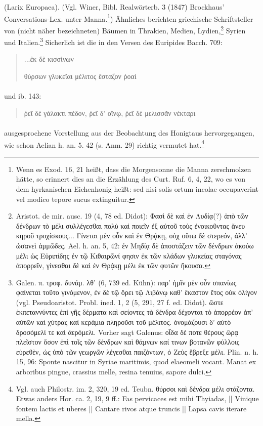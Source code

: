 \documentclass[a4paper, 11pt, oneside]{article}
\begin{document}
(Larix Europaea). (Vgl. Winer, Bibl. Realwörterb. 3 (1847) Brockhaus' Conversations-Lex. unter Manna.\footnote{Wenn es Exod. 16, 21 heißt, dass die Morgensonne die Manna zerschmolzen hätte, so erinnert dies an die Erzählung des Curt. Ruf. 6, 4, 22, wo es von dem hyrkanischen Eichenhonig heißt: sed nisi solis ortum incolae occupaverint vel modico tepore sucus extinguitur.}) Ähnliches berichten griechische Schriftsteller von (nicht näher bezeichneten) Bäumen in Thrakien, Medien, Lydien,\footnote{Aristot. de mir. ausc. 19 (4, 78 ed. Didot): Φασὶ δὲ καὶ ἐν Λυδίᾳ(?) ἀπὸ τῶν δένδρων τὸ μέλι συλλέγεσθαι πολὺ καὶ ποιεῖν ἐξ αὐτοῦ τοὺς ἐνοικοῦντας ἄνευ κηροῦ τροχίσκους... Γίνεται μὲν οὖν καὶ ἐν Θρᾴκῃ, οὐχ οὕτω δὲ στερεόν, ἀλλ' ὡσανεὶ ἀμμῶδες. Ael. h. an. 5, 42: ἐν Μηδίᾳ δὲ ἀποστάζειν τῶν δένδρων ἀκούω μέλι ὡς Εὐριπίδης ἐν τῷ Κιθαιρῶνί φησιν ἐκ τῶν κλάδων γλυκείας σταγόνας ἀπορρεῖν, γίνεσθαι δὲ καὶ ἐν Θρᾴκῃ μέλι ἐκ τῶν φυτῶν ἤκουσα.} Syrien und Italien.\footnote{Galen. π. τροφ. δυνάμ. λθʹ (6, 739 ed. Kühn): παρ' ἡμῖν μὲν οὖν σπανίως φαίνεται τοῦτο γινόμενον, ἐν δὲ τῷ ὄρει τῷ Λιβάνῳ καθ' ἕκαστον ἔτος οὐκ ὀλίγον (vgl. Pseudoaristot. Probl. ined. 1, 2 (5, 291, 27 f. ed. Didot). ὥστε ἐκπεταννύντες ἐπὶ γῆς δέρματα καὶ σείοντες τὰ δένδρα δέχονται τὸ ἀπορρέον ἀπ' αὐτῶν καὶ χύτρας καὶ κεράμια πληροῦσι τοῦ μέλιτος. ὀνομάζουσι δ' αὐτὸ δροσόμελί τε καὶ ἀερόμελι. Vorher sagt Galenus: οἷδα δέ ποτε θέρους ὥρᾳ πλεῖστον ὅσον ἐπὶ τοῖς τῶν δένδρων καὶ θάμνων καί τινων βοτανῶν φύλλοις εὐρεθὲν, ὡς ὑπὸ τῶν γεωργῶν λέγεσθαι παιζόντων, ὁ Ζεὺς ἔβρεξε μέλι. Plin. n. h. 15, 96: Sponte nascitur in Syriae maritimis, quod elaeomeli vocant. Manat ex arboribus pingue, crassius melle, resina tenuius, sapore dulci.} Sicherlich ist die in den Versen des Euripides Bacch. 709:
\begin{quotation}
...ἐκ δὲ κισσίνων

θύρσων γλυκεῖαι μέλιτος ἔσταζον ῥοαί
\end{quotation}
\paragraph{}
und ib. 143:
\begin{quotation}
ῥεῖ δὲ γάλακτι πέδον, ῥεῖ δ' οἴνῳ, ῥεῖ δὲ μελισσᾶν νέκταρι
\end{quotation}
\paragraph{}
ausgesprochene Vorstellung aus der Beobachtung des Honigtaus hervorgegangen, wie schon Aelian h. an. 5. 42 (s. Anm. 29) richtig vermutet hat.\footnote{Vgl. auch Philostr. im. 2, 320, 19 ed. Teubn. θύρσοι καὶ δένδρα μέλι στάζοντα. Etwas anders Hor. ca. 2, 19, 9 ff.: Fas pervicaces est mihi Thyiadas, || Vinique fontem lactis et uberes || Cantare rivos atque truncis || Lapsa cavis iterare mella.}
\end{document}
